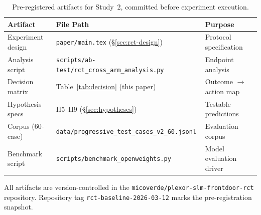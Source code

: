 \documentclass{article}
\begin{document}
\begin{table}[H]
\centering
\caption{Pre-registered artifacts for Study~2, committed before experiment execution.}
\label{tab:prereg-artifacts}
\small
\begin{tabular}{lp{7cm}p{3.5cm}}
\toprule
Artifact & File Path & Purpose \\
\midrule
Experiment design & \texttt{paper/main.tex} (\S\ref{sec:rct-design}) & Protocol specification \\
Analysis script & \texttt{scripts/ab-test/\allowbreak{}rct\_cross\_arm\_analysis.py} & Endpoint analysis \\
Decision matrix & Table~\ref{tab:decision} (this paper) & Outcome $\to$ action map \\
Hypothesis specs & H5--H9 (\S\ref{sec:hypotheses}) & Testable predictions \\
Corpus (60-case) & \texttt{data/progressive\_test\_\allowbreak{}cases\_v2\_60.jsonl} & Evaluation corpus \\
Benchmark script & \texttt{scripts/benchmark\_\allowbreak{}openweights.py} & Model evaluation driver \\
\bottomrule
\end{tabular}

\smallskip
{\footnotesize All artifacts are version-controlled in the \texttt{micoverde/plexor-slm-frontdoor-rct} repository. Repository tag \texttt{rct-baseline-2026-03-12} marks the pre-registration snapshot.}
\end{table}
\end{document}
